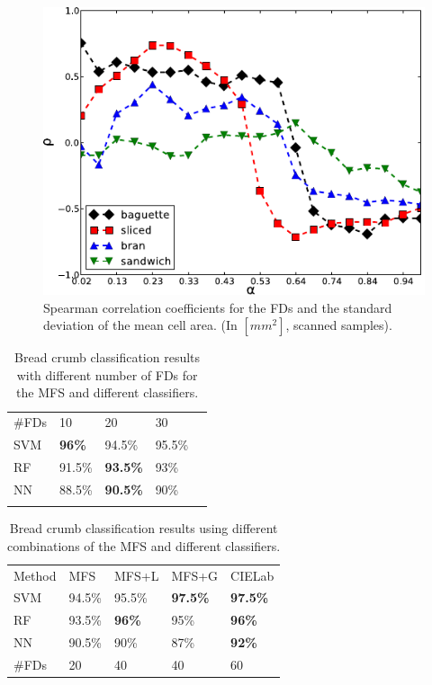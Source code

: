 \documentclass[spanish,a4paper,11pt,oneside,links]{report}
\begin{document}
\begin{figure}[h!]
\centering
\includegraphics{stMCA}
\caption{Spearman correlation coefficients for the FDs and the standard deviation of the mean cell area. (In $[mm^{2}]$, scanned samples).}
\label{fig:corrMCAstdev}
\end{figure}




\begin{table}[h!]
\caption{Bread crumb classification results with different number of FDs for the MFS and different classifiers.}
\label{tab:number}       %
\begin{tabular}{lllll}
\hline\noalign{\smallskip}
\#FDs & 10  & 20 & 30 \\
\noalign{\smallskip}\hline\noalign{\smallskip}
SVM & \textbf{96\%} & 94.5\% & 95.5\% \\
RF  & 91.5\% & \textbf{93.5\%} & 93\% \\
NN & 88.5\% & \textbf{90.5\%} & 90\% \\
\noalign{\smallskip}\hline
\end{tabular}
\end{table}


\begin{table}[h!]
\caption{Bread crumb classification results using different combinations of the MFS and different classifiers.}
\label{tab:mfs}       %
\begin{tabular}{lllll}
\hline\noalign{\smallskip}
Method & MFS & MFS+L & MFS+G & CIELab  \\
\noalign{\smallskip}\hline\noalign{\smallskip}
SVM & 94.5\% & 95.5\% & \textbf{97.5\%} & \textbf{97.5\%} \\
RF  & 93.5\% & \textbf{96\%} & 95\% & \textbf{96\%} \\
NN & 90.5\% & 90\% & 87\% & \textbf{92\%} \\
\noalign{\smallskip}\hline
\#FDs & 20 & 40 & 40 & 60 \\
\hline
\end{tabular}
\end{table}
\end{document}
